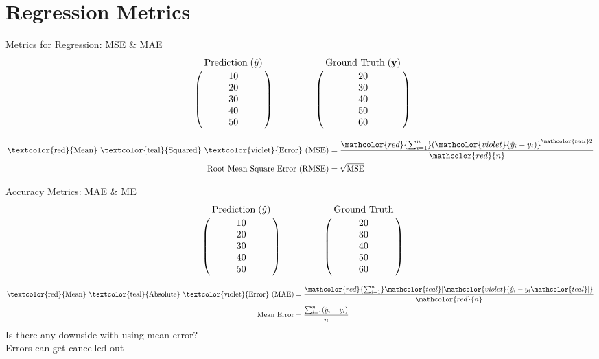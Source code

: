 \documentclass[usenames,dvipsnames]{beamer}
\begin{document}
\section{Regression Metrics}

\begin{frame}{Metrics for Regression: MSE \& MAE}
$$
\bordermatrix{&\text{Prediction}\;(\hat{y})\cr
               &10\cr
               &20\cr
                &30\cr
                &40\cr
               &50}
\qquad \qquad
\bordermatrix{&\text{Ground Truth}\;(\vy)\cr
               &20\cr
               &30\cr
                &40\cr
                &50\cr
               &60}
$$

\begin{align*}
\text{\textcolor{red}{Mean} \textcolor{teal}{Squared} \textcolor{violet}{Error} (MSE)} &=  \frac{\mathcolor{red}{\sum_{i=1}^{n}}(\mathcolor{violet}{\hat{y}_i-y_i)}^{\mathcolor{teal}2}}{\mathcolor{red}{n}} \\ 
\text{Root Mean Square Error (RMSE)} &=  \sqrt{\text{MSE}}
\end{align*}

\end{frame}

\begin{frame}{Accuracy Metrics: MAE \& ME}
$$
\bordermatrix{&\text{Prediction}\;(\hat{y})\cr
               &10\cr
               &20\cr
                &30\cr
                &40\cr
               &50}
\qquad \qquad
\bordermatrix{&\text{Ground Truth}\cr
               &20\cr
               &30\cr
                &40\cr
                &50\cr
               &60}
$$

\begin{align*}
\text{\textcolor{red}{Mean} \textcolor{teal}{Absolute} \textcolor{violet}{Error} (MAE)} &=  \frac{\mathcolor{red}{\sum_{i=1}^{n}}\mathcolor{teal}|\mathcolor{violet}{\hat{y}_i-y_i\mathcolor{teal}|}}{\mathcolor{red}{n}} \\ 
\text{Mean Error} &=  \frac{\sum_{i=1}^{n}(\hat{y}_i-y_i)}{n}
\end{align*}
\pause Is there any downside with using mean error?\\
\pause Errors can get cancelled out

\end{frame}

\end{document}
